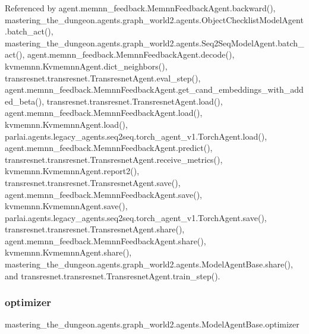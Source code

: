 Referenced by agent.\+memnn\+\_\+feedback.\+Memnn\+Feedback\+Agent.\+backward(), mastering\+\_\+the\+\_\+dungeon.\+agents.\+graph\+\_\+world2.\+agents.\+Object\+Checklist\+Model\+Agent.\+batch\+\_\+act(), mastering\+\_\+the\+\_\+dungeon.\+agents.\+graph\+\_\+world2.\+agents.\+Seq2\+Seq\+Model\+Agent.\+batch\+\_\+act(), agent.\+memnn\+\_\+feedback.\+Memnn\+Feedback\+Agent.\+decode(), kvmemnn.\+Kvmemnn\+Agent.\+dict\+\_\+neighbors(), transresnet.\+transresnet.\+Transresnet\+Agent.\+eval\+\_\+step(), agent.\+memnn\+\_\+feedback.\+Memnn\+Feedback\+Agent.\+get\+\_\+cand\+\_\+embeddings\+\_\+with\+\_\+added\+\_\+beta(), transresnet.\+transresnet.\+Transresnet\+Agent.\+load(), agent.\+memnn\+\_\+feedback.\+Memnn\+Feedback\+Agent.\+load(), kvmemnn.\+Kvmemnn\+Agent.\+load(), parlai.\+agents.\+legacy\+\_\+agents.\+seq2seq.\+torch\+\_\+agent\+\_\+v1.\+Torch\+Agent.\+load(), agent.\+memnn\+\_\+feedback.\+Memnn\+Feedback\+Agent.\+predict(), transresnet.\+transresnet.\+Transresnet\+Agent.\+receive\+\_\+metrics(), kvmemnn.\+Kvmemnn\+Agent.\+report2(), transresnet.\+transresnet.\+Transresnet\+Agent.\+save(), agent.\+memnn\+\_\+feedback.\+Memnn\+Feedback\+Agent.\+save(), kvmemnn.\+Kvmemnn\+Agent.\+save(), parlai.\+agents.\+legacy\+\_\+agents.\+seq2seq.\+torch\+\_\+agent\+\_\+v1.\+Torch\+Agent.\+save(), transresnet.\+transresnet.\+Transresnet\+Agent.\+share(), agent.\+memnn\+\_\+feedback.\+Memnn\+Feedback\+Agent.\+share(), kvmemnn.\+Kvmemnn\+Agent.\+share(), mastering\+\_\+the\+\_\+dungeon.\+agents.\+graph\+\_\+world2.\+agents.\+Model\+Agent\+Base.\+share(), and transresnet.\+transresnet.\+Transresnet\+Agent.\+train\+\_\+step().

\mbox{\label{classmastering__the__dungeon_1_1agents_1_1graph__world2_1_1agents_1_1ModelAgentBase_a853b9d9c13d35c0f00a04ad9eea73668}} 
\subsubsection{\texorpdfstring{optimizer}{optimizer}}
{\footnotesize\ttfamily mastering\+\_\+the\+\_\+dungeon.\+agents.\+graph\+\_\+world2.\+agents.\+Model\+Agent\+Base.\+optimizer}



